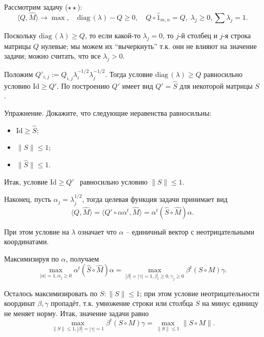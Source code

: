 \documentclass[handout]{beamer}
\renewcommand\le{\leqslant}
\renewcommand\ge{\geqslant}
\begin{document}
\begin{frame}
    Рассмотрим задачу ($\star\star$):
    $$
    \langle Q,\widehat M\rangle\to\max,\quad\mathrm{diag}\,(\lambda)-Q\ge
    0,\quad Q\circ\widehat{1}_{m,n}=Q,\;\lambda_j\ge0,\sum\lambda_j=1.
    $$
    \pause\vspace{5pt}

        Поскольку $\mathrm{diag}\,(\lambda) \ge Q$, то если какой-то
        $\lambda_j=0$, то $j$-й столбец и $j$-я строка матрицы
        $Q$ нулевые; мы можем их ``вычеркнуть'' т.к. они не влияют на
        значение задачи; можно считать, что все $\lambda_j>0$.
    \pause\vspace{5pt}
        
        Положим $
        Q'_{i,j}:=Q_{i,j}\lambda_i^{-1/2}\lambda_j^{-1/2}$. Тогда условие $
        \mathrm{diag}\,(\lambda) \ge Q$ равносильно условию $\mathrm{Id}\ge Q'$. По
        построению $Q'$ имеет вид $Q'=\widehat S$ для некоторой
        матрицы $S$.
    \pause\vspace{5pt}
        
        Упражнение. Докажите, что следующие неравенства равносильны:
        \begin{itemize}
            \item $\mathrm{Id}\ge \widehat S$;
            \item $\|S\|\le 1$;
            \item $\|\widehat S\|\le 1$.
        \end{itemize}
    \pause\vspace{5pt}
        
        Итак, условие $\mathrm{Id}\ge Q'$  равносильно условию $
        \|S\|\le 1$.
\end{frame}

\begin{frame}

        Наконец, пусть $\alpha_j = \lambda_j^{1/2}$, тогда целевая функция
        задачи принимает вид
        $$
        \langle Q,\widehat M\rangle = \langle Q'\circ\alpha\alpha^t,
        \widehat M\rangle = \alpha^t(\widehat S\circ \widehat M)\alpha.
        $$
    \pause

        При этом условие на $\lambda$ означает что $\alpha$ --
        единичный вектор с неотрицательными координатами.
    \pause
        
        Максимизируя по $\alpha$, получаем
        $$
        \max_{|\alpha|=1,\alpha_j\ge 0} \alpha^t(\widehat
        S\circ\widehat M)\alpha = \max_{|\beta|=|\gamma|=1,\beta_i\ge
        0,\gamma_j\ge 0}\beta^t(S\circ M)\gamma.
        $$
    \pause\vspace{5pt}

        Осталось максимизировать по $S\colon \|S\|\le 1$; при этом условие
        неотрицательности координат $\beta,\gamma$ пропадёт, т.к.
        умножение строки или столбца $S$ на минус единицу не меняет норму.
        Итак, значение задачи равно
        $$
        \max_{\|S\|\le 1,|\beta|=|\gamma|=1}\beta^t(S\circ
        M)\gamma = \max_{\|S\|\le 1}\|S\circ M\|.
        $$
\end{frame}
\end{document}
